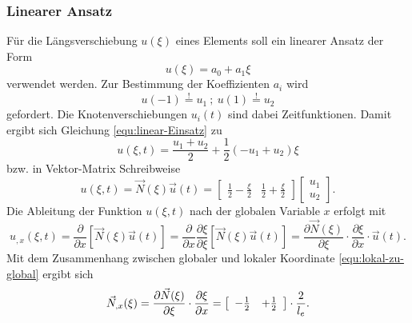 \documentclass[a4paper,10pt,twoside]{article}
\numberwithin{equation}{section} %
\numberwithin{figure}{section}   %
\numberwithin{table}{section}    %
\begin{document}
	\subsubsection{Linearer Ansatz} \label{sec:linealischer ansatz}
	Für die Längsverschiebung $ u(\xi) $ eines Elements soll ein linearer Ansatz der Form
	\begin{equation}\label{equ:linear-Einsatz}
	u(\xi)=a_{0}+a_{1}\xi
	\end{equation}
	verwendet werden. Zur Bestimmung der Koeffizienten $a_{i}$ wird
	\begin{equation}\label{equ:linear-Einsatz-Forderung}
	u(-1) \overset{!}{=} u_{1} \ ; \  u(1) \overset{!}{=} u_{2}
	\end{equation}	
	gefordert. Die Knotenverschiebungen $u_{i}(t)$ sind dabei Zeitfunktionen. Damit ergibt sich Gleichung \eqref{equ:linear-Einsatz} zu
	\begin{equation}\label{equ:linear-Einsatz-eingesetzt}
	u(\xi,t)=\frac{u_{1}+u_{2}}{2} + \frac{1}{2} (-u_{1}+u_{2})\xi
	\end{equation}
	bzw. in Vektor-Matrix Schreibweise
	\begin{equation}\label{equ:linear-Einsatz-Algebra}
	u(\xi,t) = \vec{N}(\xi) \vec{u}(t) =
	\left[ \begin{array}{cc}
	\frac{1}{2} - \frac{\xi}{2} & \frac{1}{2} + \frac{\xi}{2}
	\end{array} \right]	
	\left[ 
	\begin{array}{c}
	u_{1}\\
	u_{2}
	\end{array} 
	\right] .
	\end{equation}
	Die Ableitung der Funktion $ u(\xi,t) $ nach der globalen Variable $x$ erfolgt mit
	\begin{equation}\label{equ:stab-ux-Ableitung}
	u_{,x}(\xi,t)= \frac{\partial}{\partial x} [\vec{N}(\xi) \vec{u}(t) ] = \frac{\partial}{\partial x} \frac{\partial \xi}{\partial \xi} [\vec{N}(\xi) \vec{u}(t)] =  \frac{\partial \vec{N}(\xi)}{\partial \xi} \cdot \frac{\partial \xi}{\partial x} \cdot \vec{u}(t).
	\end{equation}
	Mit dem Zusammenhang zwischen globaler und lokaler Koordinate \eqref{equ:lokal-zu-global} ergibt sich
	\begin{equation}\label{equ:linear-N-x-Ableitung}
	\vec{N}_{,x}(\xi) = \frac{\partial \vec{N}(\xi)}{\partial \xi} \cdot \frac{\partial \xi}{\partial x} =
	\left[
	\begin{array}{c c} 
	-\frac{1}{2} & +\frac{1}{2} 
	\end{array}
	\right]
	\cdot \frac{2}{l_{e}}.
	\end{equation}
\end{document}
